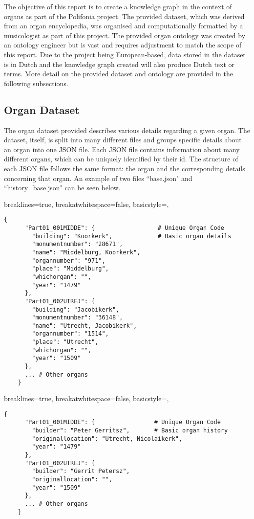 The objective of this report is to create a knowledge graph in the context of organs as part of the Polifonia project. The provided dataset, which was derived from an organ encyclopedia, was organised and computationally formatted by a musicologist as part of this project. The provided organ ontology \cite{organontology} was created by an ontology engineer but is vast and requires adjustment to match the scope of this report. Due to the project being European-based, data stored in the dataset is in Dutch and the knowledge graph created will also produce Dutch text or terms. More detail on the provided dataset and ontology are provided in the following subsections.  

\subsection{Organ Dataset}
\hspace{0.5cm} The organ dataset provided describes various details regarding a given organ. The dataset, itself, is split into many different files and groups specific details about an organ into one JSON file. Each JSON file contains information about many different organs, which can be uniquely identified by their id. The structure of each JSON file follows the same format: the organ and the corresponding details concerning that organ. An example of two files ``base.json" and ``history\_base.json" can be seen below. 

\lstset
{
    breaklines=true,
    breakatwhitespace=false,
    basicstyle=\linespread{1.25}\ttfamily,
}
\begin{lstlisting}[caption=base.json extract]
    {
      "Part01_001MIDDE": {                  # Unique Organ Code
        "building": "Koorkerk",             # Basic organ details
        "monumentnumber": "28671",
        "name": "Middelburg, Koorkerk",
        "organnumber": "971",
        "place": "Middelburg",
        "whichorgan": "",
        "year": "1479"
      },
      "Part01_002UTREJ": {
        "building": "Jacobikerk",
        "monumentnumber": "36148",
        "name": "Utrecht, Jacobikerk",
        "organnumber": "1514",
        "place": "Utrecht",
        "whichorgan": "",
        "year": "1509"
      },
      ... # Other organs
    }
\end{lstlisting}

\lstset
{
    breaklines=true,
    breakatwhitespace=false,
    basicstyle=\linespread{1.25}\ttfamily,
}
\begin{lstlisting}[caption=history\_base.json extract]
    {
      "Part01_001MIDDE": {                 # Unique Organ Code
        "builder": "Peter Gerritsz",       # Basic organ history
        "originallocation": "Utrecht, Nicolaikerk",
        "year": "1479"
      },
      "Part01_002UTREJ": {
        "builder": "Gerrit Petersz",
        "originallocation": "",
        "year": "1509"
      },
      ... # Other organs
    }
\end{lstlisting}

